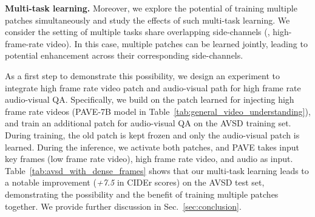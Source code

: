\medskip
\noindent \textbf{Multi-task learning.} Moreover, we explore the potential of training multiple patches simultaneously and study the effects of such multi-task learning. We consider the setting of multiple tasks share overlapping side-channels (\eg, high-frame-rate video). In this case, multiple patches can be learned jointly, leading to potential enhancement across their corresponding side-channels.

As a first step to demonstrate this possibility, we design an experiment to integrate high frame rate video patch and audio-visual path for high frame rate audio-visual QA. Specifically, we build on the patch learned for injecting high frame rate videos (PAVE-7B model in Table~\ref{tab:general_video_understanding}), and train an additional patch for audio-visual QA on the AVSD training set. During training, the old patch is kept frozen and only the audio-visual patch is learned.  During the inference, we activate both patches, and PAVE takes input key frames (\ie low frame rate video), high frame rate video, and audio as input. Table~\ref{tab:avsd_with_dense_frames} shows that our multi-task learning leads to a notable improvement (\textit{+7.5} in CIDEr scores) on the AVSD test set, demonstrating the possibility and the benefit of training multiple patches together. We provide further discussion in Sec.\ \ref{sec:conclusion}.




